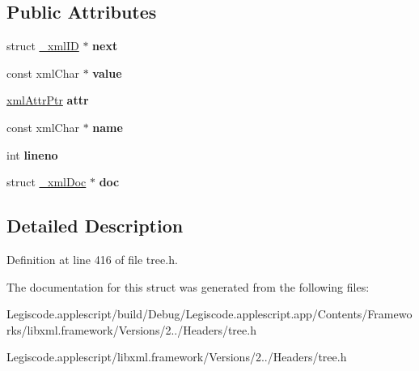 \subsection*{Public Attributes}
\begin{DoxyCompactItemize}
\item 
\hypertarget{struct__xml_i_d_a5eea0372c8976b6e6ed365818b820e26}{struct \hyperlink{struct__xml_i_d}{\-\_\-xml\-I\-D} $\ast$ {\bfseries next}}\label{struct__xml_i_d_a5eea0372c8976b6e6ed365818b820e26}

\item 
\hypertarget{struct__xml_i_d_ae0a55b852d00154a8ad1120b924160e0}{const xml\-Char $\ast$ {\bfseries value}}\label{struct__xml_i_d_ae0a55b852d00154a8ad1120b924160e0}

\item 
\hypertarget{struct__xml_i_d_a0273ce499877771549f91b374bfb6f95}{\hyperlink{struct__xml_attr}{xml\-Attr\-Ptr} {\bfseries attr}}\label{struct__xml_i_d_a0273ce499877771549f91b374bfb6f95}

\item 
\hypertarget{struct__xml_i_d_a77259e46687706750d4eee54b78f4734}{const xml\-Char $\ast$ {\bfseries name}}\label{struct__xml_i_d_a77259e46687706750d4eee54b78f4734}

\item 
\hypertarget{struct__xml_i_d_a108740dc154fd8bfedb996e6a2de419e}{int {\bfseries lineno}}\label{struct__xml_i_d_a108740dc154fd8bfedb996e6a2de419e}

\item 
\hypertarget{struct__xml_i_d_abc75a59d0b39585e97534cf2dfc4a688}{struct \hyperlink{struct__xml_doc}{\-\_\-xml\-Doc} $\ast$ {\bfseries doc}}\label{struct__xml_i_d_abc75a59d0b39585e97534cf2dfc4a688}

\end{DoxyCompactItemize}


\subsection{Detailed Description}


Definition at line 416 of file tree.\-h.



The documentation for this struct was generated from the following files\-:\begin{DoxyCompactItemize}
\item 
Legiscode.\-applescript/build/\-Debug/\-Legiscode.\-applescript.\-app/\-Contents/\-Frameworks/libxml.\-framework/\-Versions/2../\-Headers/tree.\-h\item 
Legiscode.\-applescript/libxml.\-framework/\-Versions/2../\-Headers/tree.\-h\end{DoxyCompactItemize}

